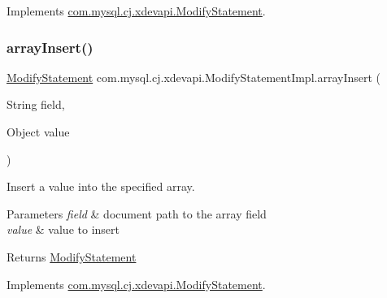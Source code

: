 Implements \mbox{\hyperlink{interfacecom_1_1mysql_1_1cj_1_1xdevapi_1_1_modify_statement_ab65173595a82dfa001a5217896e73cfc}{com.\+mysql.\+cj.\+xdevapi.\+Modify\+Statement}}.

\mbox{\label{classcom_1_1mysql_1_1cj_1_1xdevapi_1_1_modify_statement_impl_a902a626ef8ba98170a0653ca3799c0c8}} 
\subsubsection{\texorpdfstring{array\+Insert()}{arrayInsert()}}
{\footnotesize\ttfamily \mbox{\hyperlink{interfacecom_1_1mysql_1_1cj_1_1xdevapi_1_1_modify_statement}{Modify\+Statement}} com.\+mysql.\+cj.\+xdevapi.\+Modify\+Statement\+Impl.\+array\+Insert (\begin{DoxyParamCaption}\item[{String}]{field,  }\item[{Object}]{value }\end{DoxyParamCaption})}

Insert a value into the specified array.


\begin{DoxyParams}{Parameters}
{\em field} & document path to the array field \\
\hline
{\em value} & value to insert \\
\hline
\end{DoxyParams}
\begin{DoxyReturn}{Returns}
\mbox{\hyperlink{interfacecom_1_1mysql_1_1cj_1_1xdevapi_1_1_modify_statement}{Modify\+Statement}} 
\end{DoxyReturn}


Implements \mbox{\hyperlink{interfacecom_1_1mysql_1_1cj_1_1xdevapi_1_1_modify_statement_ac2c03d79835985d8b8771aee0945aea8}{com.\+mysql.\+cj.\+xdevapi.\+Modify\+Statement}}.

\mbox{\label{classcom_1_1mysql_1_1cj_1_1xdevapi_1_1_modify_statement_impl_abd17a3775a262741791dd5688a0e480e}} 
